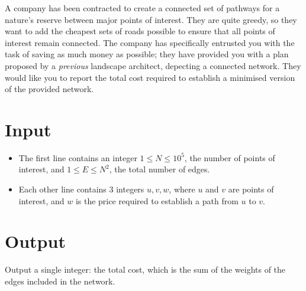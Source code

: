 A company has been contracted to create a connected set of pathways for a nature's reserve between major points of interest. They are quite greedy, so they want to add the cheapest sets of roads possible to ensure that all points of interest remain connected. The company has specifically entrusted you with the task of saving as much money as possible; they have provided you with a plan proposed by a \textit{previous} landscape architect, depecting a connected network. They would like you to report the total cost required to establish a minimised version of the provided network.

\section*{Input}
\begin{itemize}
    \item The first line contains an integer $1 \leq N \leq 10^5$, the number of points of interest, and $1 \leq E \leq N^2$, the total number of edges.
    \item Each other line contains 3 integers $u, v, w$, where $u$ and $v$ are points of interest, and $w$ is the price required to establish a path from $u$ to $v$.
\end{itemize}

\section*{Output}
Output a single integer: the total cost, which is the sum of the weights of the edges included in the network.